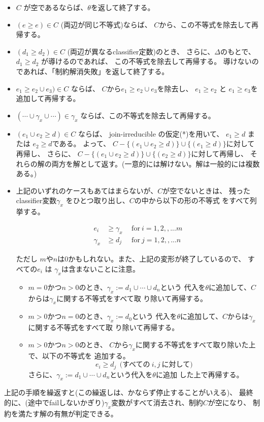 \documentclass[dvipdfmx]{jsarticle}
\begin{document}
\begin{itemize}
\item $C$ が空であるならば、$\theta$を返して終了する。
\item $(e \ge e) \in C$ (両辺が同じ不等式)ならば、
$C$から、この不等式を除去して再帰する。
\item $(d_1 \ge d_2) \in C$ (両辺が異なるclassifier定数)のとき、
さらに、$\Delta$のもとで、$d_1 \ge d_2$ が導けるのであれば、
この不等式を除去して再帰する。
導けないのであれば、「制約解消失敗」を返して終了する。
\item $e_1 \ge e_2 \cup e_3) \in C$ ならば、
$C$から$e_1 \ge e_2 \cup e_3$を除去し、
$e_1 \ge e_2$ と $e_1 \ge e_3$を追加して再帰する。
\item $(\cdots \cup \gamma_x \cup \cdots) \in \gamma_x$ 
ならば、この不等式を除去して再帰する。
\item $(e_1 \cup e_2 \ge d) \in C$ ならば、
join-irreducible の仮定(*)を用いて、
$e_1 \ge d$ または $e_2 \ge d$である。
よって、
$C - \{(e_1 \cup e_2 \ge d)\} \cup \{(e_1 \ge d)\}$に対して再帰し、
さらに、
$C - \{(e_1 \cup e_2 \ge d)\} \cup \{(e_2 \ge d)\}$に対して再帰し、
それらの解の両方を解として返す。(一意的には解けない。解は一般的には複数ある。)
\item 上記のいずれのケースもあてはまらないが、$C$が空でないときは、
残ったclassifier変数$\gamma_x$ をひとつ取り出し、$C$の中から以下の形の不等式
をすべて列挙する。

\begin{align*}
e_i & \ge \gamma_x  ~~ & \text{for}~ i=1,2,,...m\\
\gamma_x & \ge d_j  ~~ & \text{for}~ j=1,2,,...n
\end{align*}

ただし $m$や$n$は0かもしれない。また、上記の変形が終了しているので、
すべての$e_i$ は $\gamma_x$は含まないことに注意。

\begin{itemize}
\item $m=0$かつ$n>0$のとき、$\gamma_x:=d_1 \cup \cdots \cup d_n$という
代入を$\theta$に追加して、$C$からは$\gamma_x$に関する不等式をすべて取
り除いて再帰する。
\item $m>0$かつ$n=0$のとき、$\gamma_x:=d_0$という
代入を$\theta$に追加して、$C$からは$\gamma_x$に関する不等式をすべて取
り除いて再帰する。
\item $m>0$かつ$n>0$のとき、
$C$から$\gamma_x$に関する不等式をすべて取り除いた上で、以下の不等式を
追加する。
\[
e_i \ge d_j   ~~\textrm{(すべての}~i,j~\textrm{に対して)}
\]
さらに、$\gamma_x:=d_1 \cup \cdots \cup d_n$という代入を$\theta$に追加
した上で再帰する。
\end{itemize}
\end{itemize}

上記の手順を繰返すと(この繰返しは、かならず停止することがいえる)、
最終的に、(途中でfailしないかぎり)$\gamma_x$変数がすべて消去され、制約$C$が空になり、
制約を満たす解の有無が判定できる。
\end{document}
